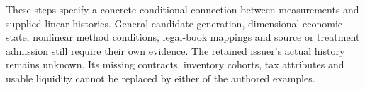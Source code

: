 These steps specify a concrete conditional connection between measurements and
supplied linear histories. General candidate generation, dimensional economic
state, nonlinear method conditions, legal-book mappings and source or treatment
admission still require their own evidence. The retained issuer's actual history
remains unknown. Its missing contracts, inventory cohorts, tax attributes and
usable liquidity cannot be replaced by either of the authored examples.
